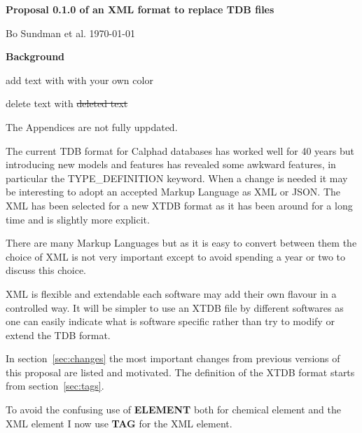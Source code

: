 \documentclass{article}
\begin{document}
\begin{center}

  {\Large \bf Proposal 0.1.0 of an XML format to replace TDB files}

  Bo Sundman et al. \today

  \vspace{5mm}

  {\large \bf Background}

\end{center}

add text with {\color{red} with your own color}

delete text with \sout{deleted text}

The Appendices are not fully uppdated.

\bigskip

The current TDB format for Calphad databases has worked well for 40
years but introducing new models and features has revealed some
awkward features, in particular the TYPE\_DEFINITION keyword.  When a
change is needed it may be interesting to adopt an accepted Markup
Language as XML or JSON.  The XML has been selected for a new XTDB
format as it has been around for a long time and is slightly more
explicit.

There are many Markup Languages but as it is easy to convert between
them the choice of XML is not very important except to avoid spending
a year or two to discuss this choice.

XML is flexible and extendable each software may add their own flavour
in a controlled way.  It will be simpler to use an XTDB file by
different softwares as one can easily indicate what is software
specific rather than try to modify or extend the TDB format.

In section~\ref{sec:changes} the most important changes from previous
versions of this proposal are listed and motivated.  The definition of
the XTDB format starts from section~\ref{sec:tags}.

To avoid the confusing use of {\bf ELEMENT} both for chemical element
and the XML element I now use {\bf TAG} for the XML element.
\end{document}
